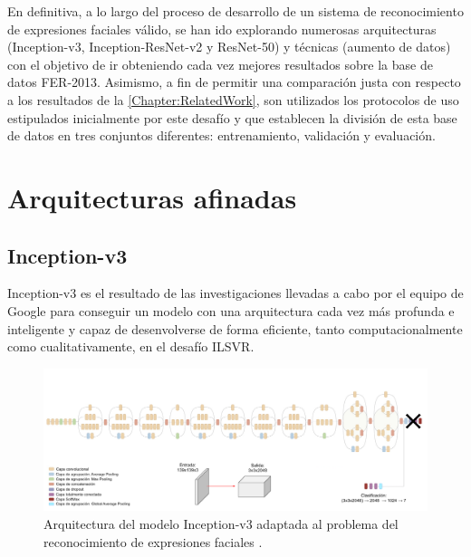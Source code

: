 En definitiva, a lo largo del proceso de desarrollo de un sistema de reconocimiento de expresiones faciales válido, se han ido explorando numerosas arquitecturas (Inception-v3, Inception-ResNet-v2 y ResNet-50) y técnicas (aumento de datos) con el objetivo de ir obteniendo cada vez mejores resultados sobre la base de datos FER-2013. Asimismo, a fin de permitir una comparación justa con respecto a los resultados de la \autoref{Chapter:RelatedWork}, son utilizados los protocolos de uso estipulados inicialmente por este desafío y que establecen la división de esta base de datos en tres conjuntos diferentes: entrenamiento, validación y evaluación.

\section{Arquitecturas afinadas}

\subsection{Inception-v3} \label{Chapter:ArchitectureInceptionV3}

Inception-v3 es el resultado de las investigaciones llevadas a cabo por el equipo de Google para conseguir un modelo con una arquitectura cada vez más profunda e inteligente y capaz de desenvolverse de forma eficiente, tanto computacionalmente como cualitativamente, en el desafío ILSVR.

\begin{figure}
    \centering
    \includegraphics[width=\textwidth]{Images/Inception-v3.png}
    \caption{Arquitectura del modelo Inception-v3 adaptada al problema del reconocimiento de expresiones faciales \cite{img:Inception-v3}.}
    \label{fig:Inception-v3}
\end{figure}

